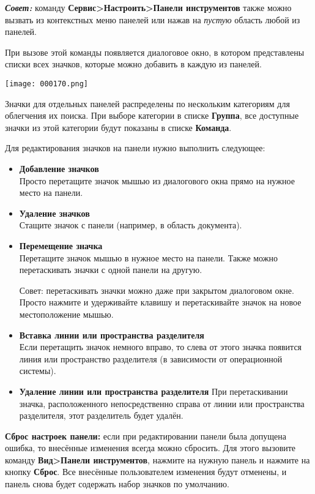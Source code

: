 ﻿\documentclass[a4paper,10pt]{article}
\begin{document}
 \begin{mdframed}[backgroundcolor=blue!10]
\textbf{\textit{Совет:}} команду \textbf{Сервис>Настроить>Панели инструментов} также можно вызвать из контекстных меню панелей или нажав на \textit{пустую} область любой из панелей.
\end{mdframed}
 
 При вызове этой команды появляется диалоговое окно, в котором представлены списки всех значков, которые можно добавить в каждую из панелей.
 
 \texttt{[image: 000170.png]}
 
 Значки для отдельных панелей распределены по нескольким категориям для облегчения их поиска. При выборе категории в списке \textbf{Группа}, все доступные значки из этой категории будут показаны в списке \textbf{Команда}.
 
 Для редактирования значков на панели нужно выполнить следующее:
 
 \begin{itemize}
  \item \textbf{Добавление значков}\\
  Просто перетащите значок мышью из диалогового окна прямо на нужное место на панели.
  \item \textbf{Удаление значков}\\
  Стащите значок с панели (например, в область документа).
  \item \textbf{Перемещение значка}\\
  Перетащите значок мышью в нужное место на панели. Также можно перетаскивать значки с одной панели на другую.
  
  Совет: перетаскивать значки можно даже при закрытом диалоговом окне. Просто нажмите и удерживайте клавишу  и перетаскивайте значок на новое местоположение мышью.
  \item \textbf{Вставка линии или пространства разделителя}\\
  Если перетащить значок немного вправо, то слева от этого значка появится линия или пространство разделителя (в зависимости от операционной системы).
  \item \textbf{Удаление линии или пространства разделителя}
  При перетаскивании значка, расположенного непосредственно справа от линии или пространства разделителя, этот разделитель будет удалён.
 \end{itemize}

 \textbf{Сброс настроек панели:} если при редактировании панели была допущена ошибка, то внесённые изменения всегда можно сбросить. Для этого вызовите команду \textbf{Вид>Панели инструментов}, нажмите на нужную панель и нажмите на кнопку \textbf{Сброс}. Все внесённые пользователем изменения будут отменены, и панель снова будет содержать набор значков по умолчанию.
 
\end{document}
